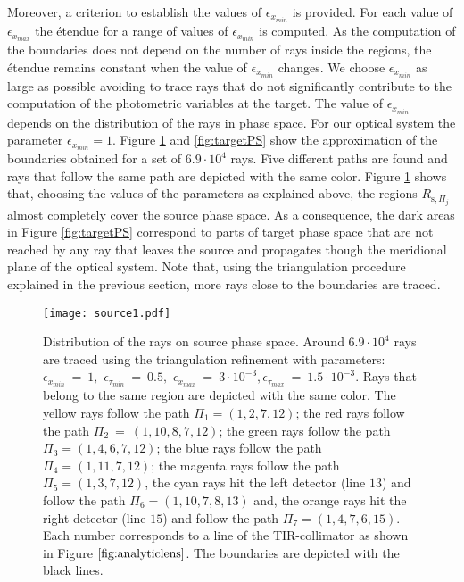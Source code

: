 Moreover, a criterion to establish the values of $\epsilon_{x_{min}}$ is provided.
For each value of $\epsilon_{x_{max}}$ the  \'{e}tendue for a range of values of $\epsilon_{x_{min}}$ is computed.
As the computation of the boundaries does not depend on the number of rays inside the regions, the \'{e}tendue remains constant when the value of $\epsilon_{x_{min}}$ changes. We choose $\epsilon_{x_{min}}$ as large as possible avoiding to trace rays that do not significantly contribute to the computation of the photometric variables at the target.
The value of $\epsilon_{x_{min}}$ depends on the distribution of the rays in phase space. For our optical system the parameter $\epsilon_{x_{min}}=1$.
Figure \ref{fig:sourcePS} and \ref{fig:targetPS} show the approximation of the boundaries obtained for a set of $ 6.9\cdot 10^4$ rays. Five different paths are found and rays that follow the same path are depicted with the same color. Figure \ref{fig:sourcePS} shows that, choosing the values of the parameters as explained above, the regions $R_{\textrm{s}, \Pi_j}$ almost completely cover the source phase space. As a consequence, the dark areas in Figure \ref{fig:targetPS} correspond to parts of target phase space that are not reached by any ray that leaves the source and propagates though the meridional plane of the optical system. Note that, using the triangulation procedure explained in the previous section, more rays close to the boundaries are traced.

\begin{figure}[h]
  \begin{center}
  \texttt{[image: source1.pdf]}
  \end{center}
  \caption{\footnotesize{Distribution of the rays on source phase space. Around $6.9 \cdot 10^4$ rays are traced using the triangulation refinement with parameters:
  $\epsilon_{x_{min}} ~=~ 1 ,$ $ \epsilon_{\tau_{min}} ~=~ 0.5, $ $\epsilon_{x_{max}} ~=~ 3\cdot 10^{-3}, \epsilon_{\tau_{max}} ~=~ 1.5 \cdot 10^{-3}$. Rays that belong to the same region are depicted with the same color. The yellow rays follow the path $\Pi_1 = (1, 2, 7, 12)$;
   the red rays follow the path $\Pi_2 ~= ~(1, 10, 8, 7, 12)$; the green rays follow the path $\Pi_3 = (1, 4, 6, 7, 12)$;
   the blue rays follow the path $\Pi_4= (1, 11, 7, 12)$; the magenta rays follow the path $\Pi_5= (1, 3, 7, 12)$, the cyan rays hit the left detector (line $13$) and follow the path
   $\Pi_6= (1, 10, 7, 8, 13)$ and, the orange rays hit the right detector (line $15$) and follow the path $\Pi_7= (1, 4, 7, 6, 15)$. Each number corresponds to a line of the TIR-collimator as shown in Figure $\ref{fig:analyticlens}$.
  The boundaries are depicted with the black lines.}}
  \label{fig:sourcePS}
\end{figure}


